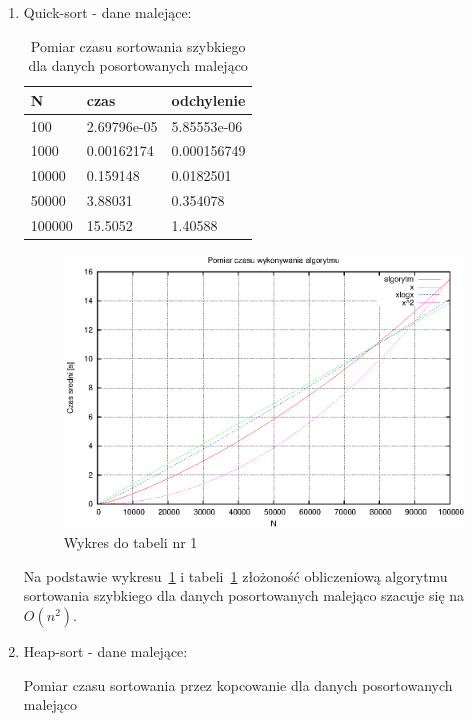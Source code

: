 \documentclass[a4paper,11pt]{article}
\begin{document}
\begin{enumerate}
 \item Quick-sort - dane malejące:
   
  \begin{table}[th]
  \centering
    \caption{Pomiar czasu sortowania szybkiego dla danych posortowanych malejąco}

      \begin{tabular}{|l|l|l|}
	\hline
	N & czas & odchylenie \\
    \hline
 100 & 2.69796e-05 & 5.85553e-06\\
 \hline
1000 & 0.00162174 & 0.000156749\\
\hline
10000 & 0.159148 & 0.0182501\\
\hline
50000 & 3.88031 & 0.354078\\
\hline
100000 & 15.5052 & 1.40588\\


\hline
    \end{tabular}
    \label{tab1}
    \end{table}
 \begin{figure}[!h]
\centering
\includegraphics[width=1\textwidth]{../prj/wykres7.eps}
\caption{Wykres do tabeli nr 1}
\label{Wykres1}
\end{figure} 
\newpage
Na podstawie wykresu~\ref{Wykres1} i tabeli~\ref{tab1} złożoność obliczeniową algorytmu sortowania szybkiego dla danych posortowanych malejąco szacuje się na $ O(n^{2}) $.

 \item Heap-sort - dane malejące:
   
  \begin{table}[th]
  \centering
    \caption{Pomiar czasu sortowania przez kopcowanie dla danych posortowanych malejąco}


\end{table}
\end{enumerate}
\end{document}

